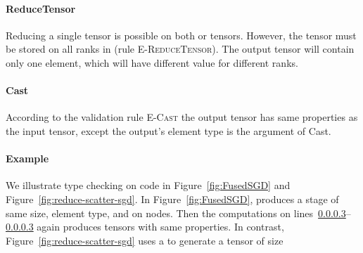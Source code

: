 \paragraph{ReduceTensor} Reducing a single tensor is possible on both \sliced or \complete tensors. However, the tensor must be stored on all ranks in \WORLD (rule \textsc{E-ReduceTensor}).
The output tensor will contain only one element, which will have different value for different ranks.

\paragraph{Cast} According to the validation rule \textsc{E-Cast} the  output tensor has same properties as the input tensor, except the output's element type is the argument of Cast.

\paragraph{Example} We illustrate type checking on \tool code in Figure~\ref{fig:FusedSGD} and Figure~\ref{fig:reduce-scatter-sgd}.
In Figure~\ref{fig:FusedSGD}, \allreduce produces a \complete stage of same size, element type, and on nodes.
Then the computations on lines~\ref{}--\ref{} again produces tensors with same properties. 
In contrast, Figure~\ref{fig:reduce-scatter-sgd} uses a \reducescatter to generate a tensor of size 

